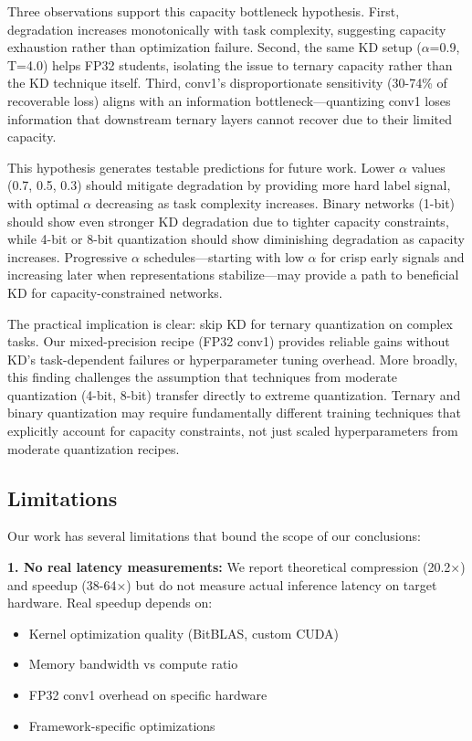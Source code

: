 Three observations support this capacity bottleneck hypothesis. First, degradation increases monotonically with task complexity, suggesting capacity exhaustion rather than optimization failure. Second, the same KD setup ($\alpha$=0.9, T=4.0) helps FP32 students, isolating the issue to ternary capacity rather than the KD technique itself. Third, conv1's disproportionate sensitivity (30-74\% of recoverable loss) aligns with an information bottleneck—quantizing conv1 loses information that downstream ternary layers cannot recover due to their limited capacity.

This hypothesis generates testable predictions for future work. Lower $\alpha$ values (0.7, 0.5, 0.3) should mitigate degradation by providing more hard label signal, with optimal $\alpha$ decreasing as task complexity increases. Binary networks (1-bit) should show even stronger KD degradation due to tighter capacity constraints, while 4-bit or 8-bit quantization should show diminishing degradation as capacity increases. Progressive $\alpha$ schedules—starting with low $\alpha$ for crisp early signals and increasing later when representations stabilize—may provide a path to beneficial KD for capacity-constrained networks.

The practical implication is clear: skip KD for ternary quantization on complex tasks. Our mixed-precision recipe (FP32 conv1) provides reliable gains without KD's task-dependent failures or hyperparameter tuning overhead. More broadly, this finding challenges the assumption that techniques from moderate quantization (4-bit, 8-bit) transfer directly to extreme quantization. Ternary and binary quantization may require fundamentally different training techniques that explicitly account for capacity constraints, not just scaled hyperparameters from moderate quantization recipes.

\subsection{Limitations}
\label{sec:discussion:limitations}

Our work has several limitations that bound the scope of our conclusions:

\textbf{1. No real latency measurements:} We report theoretical compression (20.2×) and speedup (38-64×) but do not measure actual inference latency on target hardware. Real speedup depends on:
\begin{itemize}
    \item Kernel optimization quality (BitBLAS, custom CUDA)
    \item Memory bandwidth vs compute ratio
    \item FP32 conv1 overhead on specific hardware
    \item Framework-specific optimizations
\end{itemize}

